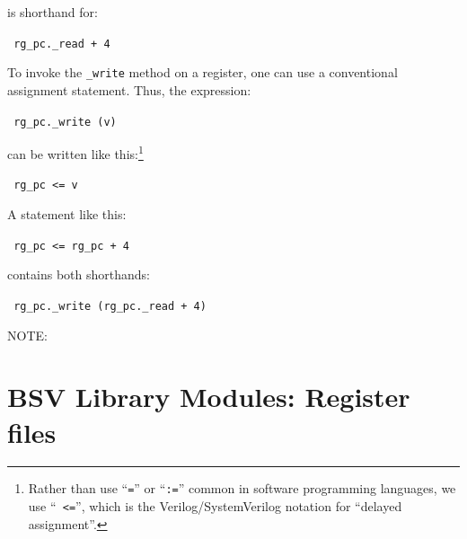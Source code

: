 is shorthand for:

\begin{tabbing}\small\tt
\hmmmm  rg\_pc.\_read + 4
\end{tabbing}

To invoke the \verb|_write| method on a register, one can use a
conventional assignment statement.  Thus, the expression:

\begin{tabbing}\small\tt
\hmmmm rg\_pc.\_write (v)
\end{tabbing}

can be written like this:\footnote{Rather than use ``{\tt =}'' or
``{\tt :=}'' common in software programming languages, we use ``{\tt
<=}'', which is the Verilog/SystemVerilog notation for ``delayed
assignment''.}

\begin{tabbing}\small\tt
\hmmmm rg\_pc <= v
\end{tabbing}

A statement like this:

\begin{tabbing}\small\tt
\hmmmm rg\_pc <= rg\_pc + 4
\end{tabbing}

contains both shorthands:

\begin{tabbing}\small\tt
\hmmmm rg\_pc.\_write (rg\_pc.\_read + 4)
\end{tabbing}

\vspace{2ex}

NOTE:


\section{BSV Library Modules: Register files}

